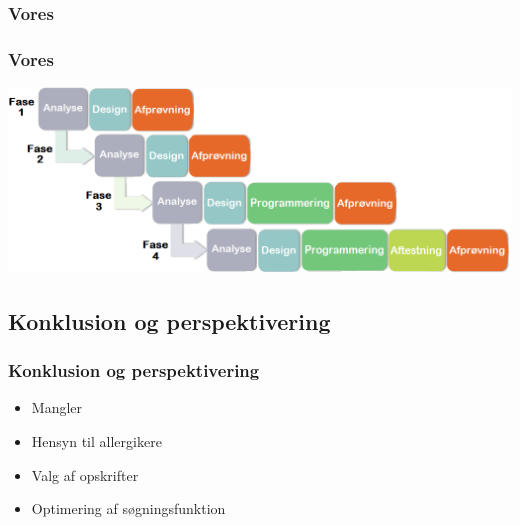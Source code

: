 \subsubsection{Vores}
\begin{frame}
	\begin{center}
	\frametitle{Vores}	
	\includegraphics[scale=0.25]{../report/billeder/blandingsmetode.png}
	\end{center}
\end{frame}


\subsection{Konklusion og perspektivering}

\begin{frame}
	\frametitle{Konklusion og perspektivering}
	\begin{itemize}
		\item Mangler
		\item Hensyn til allergikere
		\item Valg af opskrifter
		\item Optimering af søgningsfunktion
	\end{itemize}
\end{frame}